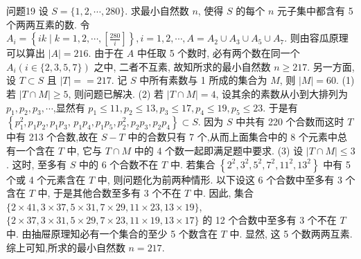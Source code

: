 问题19 设 $S=\{1,2, \cdots, 280\}$. 求最小自然数 $n$, 使得 $S$ 的每个 $n$ 元子集中都含有 5 个两两互素的数.
令 $A_i=\left\{i k \mid k=1,2, \cdots,\left[\frac{280}{i}\right]\right\}, i=1,2, \cdots, A=A_2 \cup A_3 \cup A_5 \cup A_7$. 则由容瓜原理可以算出 $|A|=216$. 由于在 $A$ 中任取 5 个数时, 必有两个数在同一个 $A_i(i \in\{2,3,5,7\})$ 之中, 二者不互素, 故知所求的最小自然数 $n \geqslant 217$.
另一方面, 设 $T \subset S$ 且 $|T|==217$. 记 $S$ 中所有素数与 1 所成的集合为 $M$, 则 $|M|=60$.
(1) 若 $|T \cap M| \geqslant 5$, 则问题已解决.
(2) 若 $|T \cap M|=4$, 设其余的素数从小到大排列为 $p_1, p_2, p_3, \cdots$,显然有 $p_1 \leqslant 11, p_2 \leqslant 13, p_3 \leqslant 17, p_4 \leqslant 19, p_5 \leqslant 23$. 于是有 $\left\{p_1^2, p_1 p_2, p_1 p_3\right.$, $\left.p_1 p_4, p_1 p_5, p_2^2, p_2 p_3, p_2 p_4\right\} \subset S$. 因为 $S$ 中共有 220 个合数而这时 $T$ 中有 213 个合数,故在 $S-T$ 中的合数只有 7 个,从而上面集合中的 8 个元素中总有一个含在 $T$ 中, 它与 $T \cap M$ 中的 4 个数一起即满足题中要求.
(3) 设 $|T \cap M| \leqslant 3$. 这时, 至多有 $S$ 中的 6 个合数不在 $T$ 中.
若集合 $\left\{2^2, 3^2, 5^2, 7^2, 11^2, 13^2\right\}$ 中有 5 个或 4 个元素含在 $T$ 中, 则问题化为前两种情形.
以下设这 6 个合数中至多有 3 个含在 $T$ 中, 于是其他合数至多有 3 个不在 $T$ 中.
因此, 集合 $\{2 \times 41,3 \times 37,5 \times 31,7 \times 29,11 \times 23,13 \times 19\}$, $\{2 \times 37,3 \times 31,5 \times 29,7 \times 23,11 \times 19,13 \times 17\}$ 的 12 个合数中至多有 3 个不在 $T$ 中.
由抽屉原理知必有一个集合的至少 5 个数含在 $T$ 中.
显然, 这 5 个数两两互素.
综上可知,所求的最小自然数 $n=217$.



